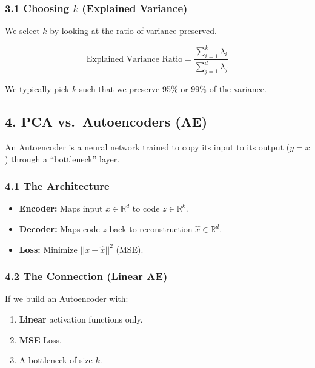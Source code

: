 \documentclass[
  italian,
  11pt,
]{article}
\begin{document}
\subsubsection{\texorpdfstring{3.1 Choosing \(k\) (Explained
Variance)}{3.1 Choosing k (Explained Variance)}}\label{choosing-k-explained-variance}

We select \(k\) by looking at the ratio of variance preserved.

\[\text{Explained Variance Ratio} = \frac{\sum_{i=1}^k \lambda_i}{\sum_{j=1}^d \lambda_j}\]

We typically pick \(k\) such that we preserve 95\% or 99\% of the
variance.

\subsection{4. PCA vs.~Autoencoders (AE)}\label{pca-vs.-autoencoders-ae}

An Autoencoder is a neural network trained to copy its input to its
output (\(y=x\)) through a ``bottleneck'' layer.

\subsubsection{4.1 The Architecture}\label{the-architecture}

\begin{itemize}
\item
  \textbf{Encoder:} Maps input \(x \in \mathbb{R}^d\) to code
  \(z \in \mathbb{R}^k\).
\item
  \textbf{Decoder:} Maps code \(z\) back to reconstruction
  \(\hat{x} \in \mathbb{R}^d\).
\item
  \textbf{Loss:} Minimize \(||x - \hat{x}||^2\) (MSE).
\end{itemize}

\subsubsection{4.2 The Connection (Linear
AE)}\label{the-connection-linear-ae}

If we build an Autoencoder with:

\begin{enumerate}
\def\labelenumi{\arabic{enumi}.}
\item
  \textbf{Linear} activation functions only.
\item
  \textbf{MSE} Loss.
\item
  A bottleneck of size \(k\).
\end{enumerate}
\end{document}
